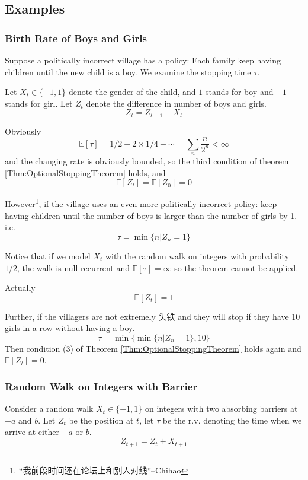     \subsection{Examples}
        \subsubsection{Birth Rate of Boys and Girls}
            Suppose a politically incorrect village has a policy: Each family keep having children until the new child is a boy. We examine the stopping time $\tau$.

            Let $X_t \in \{-1, 1\}$ denote the gender of the child, and $1$ stands for boy and $-1$ stands for girl. Let $Z_t$ denote the difference in number of boys and girls.
            \[ Z_t = Z_{t-1} + X_t \]

            Obviously
            \[ \mathbb{E}[\tau] = 1/2 + 2 \times 1/4 + \cdots = \sum_n \frac{n}{2^n} < \infty \]
            and the changing rate is obviously bounded, so the third condition of theorem \ref{Thm:OptionalStoppingTheorem} holds, and
            \[ \mathbb{E}[Z_t] = \mathbb{E}[Z_0] = 0 \]

            However\footnote{“我前段时间还在论坛上和别人对线”--Chihao}, if the village uses an even more politically incorrect policy: keep having children until the number of boys is larger than the number of girls by 1. i.e.
            \[ \tau = \min\{n|Z_n=1\} \]
            
            Notice that if we model $X_t$ with the random walk on integers with probability $1/2$, the walk is null recurrent and $\mathbb{E}[\tau] = \infty$ so the theorem cannot be applied.
            
            Actually
            \[ \mathbb{E}[Z_t] = 1 \]

            Further, if the villagers are not extremely 头铁 and they will stop if they have 10 girls in a row without having a boy.
            \[ \tau = \min\{\min\{n|Z_n=1\}, 10\} \]
            Then condition (3) of Theorem \ref{Thm:OptionalStoppingTheorem} holds again and $\mathbb{E}[Z_t] = 0$.

        \subsubsection{Random Walk on Integers with Barrier}
            Consider a random walk $X_t \in \{-1, 1\}$ on integers with two absorbing barriers at $-a$ and $b$. Let $Z_t$ be the position at $t$, let $\tau$ be the r.v. denoting the time when we arrive at either $-a$ or $b$.
            \[ Z_{t+1} = Z_t + X_{t+1} \]

